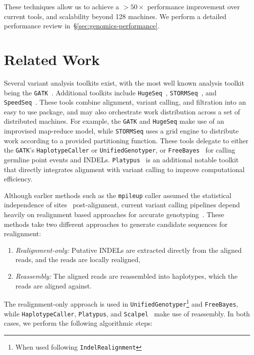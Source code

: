 \documentclass[masters]{ucbthesis}
\begin{document}
These techniques allow us to achieve a $>50\times$ performance improvement over current tools, and
scalability beyond 128 machines. We perform a detailed performance review
in~\S\ref{sec:genomics-performance}.

\section{Related Work}
\label{sec:related-work}

Several variant analysis toolkits exist, with the most well known analysis toolkit being the
\texttt{GATK}~\cite{depristo11}. Additional toolkits include \texttt{HugeSeq}~\cite{lam12},
\texttt{STORMSeq}~\cite{karczewski14}, and \texttt{SpeedSeq}~\cite{chiang14}. These tools combine
alignment, variant calling, and filtration into an easy to use package, and may also orchestrate
work distribution across a set of distributed machines. For example, the \texttt{GATK} and
\texttt{HugeSeq} make use of an improvised map-reduce model, while \texttt{STORMSeq} uses a grid
engine to distribute work according to a provided partitioning function. These tools delegate to either
the \texttt{GATK}'s \texttt{HaplotypeCaller} or \texttt{UnifiedGenotyper}, or
\texttt{FreeBayes}~\cite{garrison12} for calling germline point events and INDELs.
\texttt{Platypus}~\cite{rimmer14} is an additional notable toolkit that directly integrates alignment with
variant calling to improve computational efficiency.

Although earlier methods such as the \texttt{mpileup} caller assumed the statistical independence of
sites~\cite{li11snp} post-alignment, current variant calling pipelines depend heavily on realignment based
approaches for accurate genotyping~\cite{li14}. These methods take two different approaches to generate candidate sequences for realignment:

\begin{enumerate}
\item \emph{Realignment-only:} Putative INDELs are extracted directly from the aligned reads, and the
reads are locally realigned,
\item \emph{Reassembly:} The aligned reads are reassembled into haplotypes, which the reads are
aligned against.
\end{enumerate}

The realignment-only approach is used in \texttt{UnifiedGenotyper}\footnote{When used following
\texttt{IndelRealignment}} and \texttt{FreeBayes}, while \texttt{HaplotypeCaller}, \texttt{Platypus}, and
\texttt{Scalpel}~\cite{narzisi14} make use of reassembly. In both cases, we perform the following
algorithmic steps:
\end{document}

